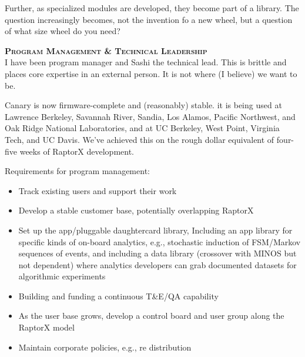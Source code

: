 \documentclass[11pt]{letter} %
\begin{document}
Further, as specialized modules are developed, they become part of a library. The question increasingly becomes, not the invention fo a new wheel, but a question of what size wheel do you need?

\vspace{20 pt}

\textsc{\textbf {Program Management \& Technical Leadership}}\\
I have been program manager and Sashi the technical lead. This is brittle and places core expertise in an external person. It is not where (I believe) we want to be.

Canary is now firmware-complete and (reasonably) stable. it is being used at Lawrence Berkeley, Savannah River, Sandia, Los Alamos, Pacific Northwest, and Oak Ridge National Laboratories, and at UC Berkeley, West Point, Virginia Tech, and UC Davis. We've achieved this on the rough dollar equivalent of four-five weeks of RaptorX development.

Requirements for program management: 
\begin{itemize}
\item Track existing users and support their work
\item Develop a stable customer base, potentially overlapping RaptorX
\item Set up the app/pluggable daughtercard library, Including an app library for specific kinds of on-board analytics, e.g., stochastic induction of FSM/Markov sequences of events, and including a data library (crossover with MINOS but not dependent) where analytics developers can grab documented datasets for algorithmic experiments
\item Building and funding a continuous T\&E/QA capability
\item As the user base grows, develop a control board and user group along the RaptorX model
\item Maintain corporate policies, e.g., re distribution
\end{itemize}
\end{document}
